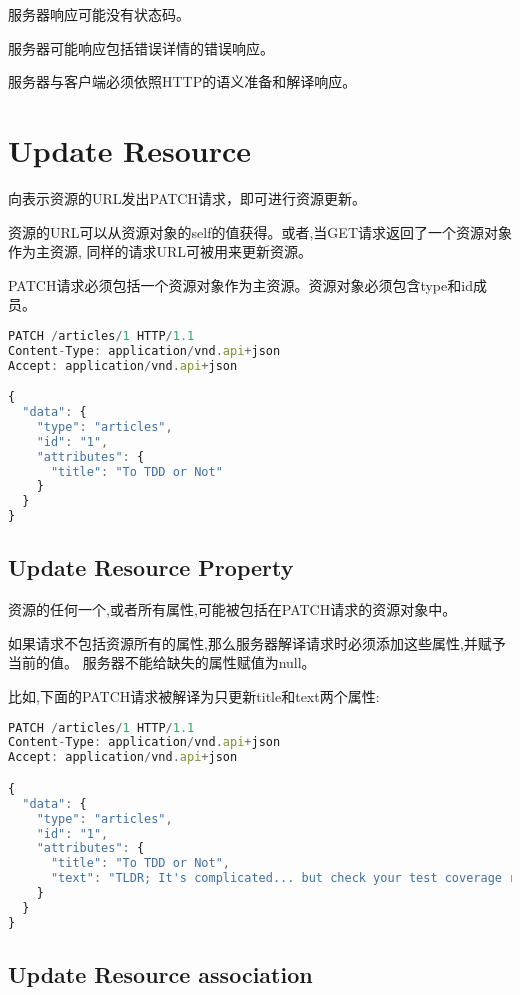服务器响应可能没有状态码。

服务器可能响应包括错误详情的错误响应。

服务器与客户端必须依照HTTP的语义准备和解译响应。

\section{Update Resource}

向表示资源的URL发出PATCH请求，即可进行资源更新。

资源的URL可以从资源对象的self的值获得。或者,当GET请求返回了一个资源对象作为主资源, 同样的请求URL可被用来更新资源。

PATCH请求必须包括一个资源对象作为主资源。资源对象必须包含type和id成员。


\begin{lstlisting}[language=JavaScript]
PATCH /articles/1 HTTP/1.1
Content-Type: application/vnd.api+json
Accept: application/vnd.api+json

{
  "data": {
    "type": "articles",
    "id": "1",
    "attributes": {
      "title": "To TDD or Not"
    }
  }
}
\end{lstlisting}


\subsection{Update Resource Property}

资源的任何一个,或者所有属性,可能被包括在PATCH请求的资源对象中。

如果请求不包括资源所有的属性,那么服务器解译请求时必须添加这些属性,并赋予当前的值。 服务器不能给缺失的属性赋值为null。

比如,下面的PATCH请求被解译为只更新title和text两个属性:

\begin{lstlisting}[language=JavaScript]
PATCH /articles/1 HTTP/1.1
Content-Type: application/vnd.api+json
Accept: application/vnd.api+json

{
  "data": {
    "type": "articles",
    "id": "1",
    "attributes": {
      "title": "To TDD or Not",
      "text": "TLDR; It's complicated... but check your test coverage regardless."
    }
  }
}
\end{lstlisting}

\subsection{Update Resource association}


